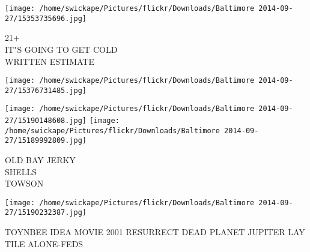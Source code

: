 \documentclass[10pt,letterpaper]{article}
\begin{document}
\texttt{[image: /home/swickape/Pictures/flickr/Downloads/Baltimore 2014-09-27/15353735696.jpg]}

21+\\
IT"S GOING TO GET COLD\\
WRITTEN ESTIMATE
\pagebreak

\texttt{[image: /home/swickape/Pictures/flickr/Downloads/Baltimore 2014-09-27/15376731485.jpg]}

\vspace{0.25in}
\texttt{[image: /home/swickape/Pictures/flickr/Downloads/Baltimore 2014-09-27/15190148608.jpg]}
\texttt{[image: /home/swickape/Pictures/flickr/Downloads/Baltimore 2014-09-27/15189992809.jpg]}

OLD BAY JERKY\\
SHELLS\\
TOWSON
\pagebreak

\texttt{[image: /home/swickape/Pictures/flickr/Downloads/Baltimore 2014-09-27/15190232387.jpg]}

TOYNBEE IDEA MOVIE 2001 RESURRECT DEAD PLANET JUPITER LAY TILE ALONE{-}FEDS
\pagebreak
\end{document}
